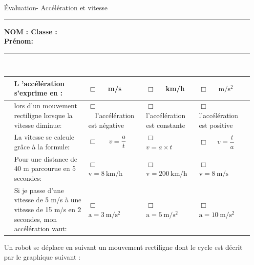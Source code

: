 \documentclass[11pt,a4paper]{article}
\begin{document}
\noindent

\begin{center}
\LARGE{Évaluation- Accélération et vitesse }\\[8mm]
\end{center}
\normalsize
\hrule 


\flushleft \textbf{NOM : \hfill Classe : \hspace{3cm} ~~\\[2mm]
Prénom:\\[0,4cm]
}
\hrule\
\\[0,2cm]

\vspace {8 mm}




    \begin{tabular}{p{2mm} p{5.5cm}|C{3cm}|C{3cm}|C{3cm}}
    

         & L 'accélération s'exprime en :& $\Box $ ~~m/s & $\Box $ ~~km/h  & $\Box $ ~~$\mathrm{m/s^2}$ \\
         \hline
       & lors d'un mouvement rectiligne lorsque la vitesse diminue: & $\Box $ ~~l'accélération est négative & $\Box $ l'accélération est constante   & $\Box $ ~~ l'accélération est positive \\
        \hline
          & La vitesse se calcule grâce à la formule:  &$\Box $ ~~ $v=\dfrac{a}{t}$  &$\Box $ ~~ $v=a \times t$  & $\Box $ ~~$v=\dfrac{t}{a}$  \\
         \hline
          &Pour une distance de 40 m parcourue en 5 secondes: &$\Box $ ~~ $\mathrm{v=8 ~km/h}$  &$\Box $ ~~ $\mathrm{v=200 ~km/h}$  & $\Box $ ~~$\mathrm{v=8 ~m/s}$  \\

         \hline
         
         & Si je passe d'une vitesse de 5 m/s à une vitesse de 15 m/s en 2 secondes, mon accélération vaut:&$\Box $ ~~ $\mathrm{a=3 ~m/s^2}$  &$\Box $ ~~ $\mathrm{a=5 ~m/s^2}$  & $\Box $ ~~$\mathrm{a=10 ~m/s^2}$  \\

 
        
         \end{tabular}
\vspace{3mm}


Un robot se déplace en suivant un mouvement rectiligne dont le cycle est décrit par le graphique suivant : 
\end{document}
